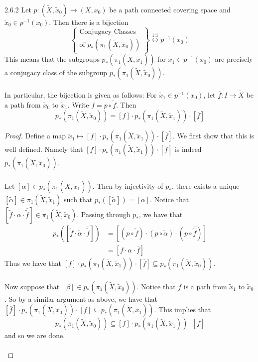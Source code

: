 \documentclass[a4paper]{article}
\begin{document}
\begin{prp}{}{2.6.2} Let $p:(\tilde{X},\tilde{x}_0)\to (X,x_0)$ be a path connected covering space and $\tilde{x}_0\in p^{-1}(x_0)$. Then there is a bijection $$\left\{\substack{\text{Conjugacy Classes}\\\text{of }p_\ast(\pi_1(\tilde{X},\tilde{x}_0))}\right\}\overset{\text{1:1}}{\longleftrightarrow} p^{-1}(x_0)$$ This means that the subgroups $p_\ast(\pi_1(\tilde{X},\tilde{x}_1))$ for $\tilde{x}_1\in p^{-1}(x_0)$ are precisely a conjugacy class of the subgroup $p_\ast(\pi_1(\tilde{X},\tilde{x}_0))$. \\~\\

In particular, the bijection is given as follows: For $\tilde{x}_1\in p^{-1}(x_0)$, let $\overline{f}:I\to\tilde{X}$ be a path from $\tilde{x}_0$ to $\tilde{x}_1$. Write $f=p\circ\tilde{f}$. Then $$p_\ast(\pi_1(\tilde{X},\tilde{x}_0))=[f]\cdot p_\ast(\pi_1(\tilde{X},\tilde{x}_1))\cdot[\overline{f}]$$ \tcbline
\begin{proof}
Define a map $\tilde{x}_1\mapsto[f]\cdot p_\ast(\pi_1(\tilde{X},\tilde{x}_1))\cdot[\overline{f}]$. We first show that this is well defined. Namely that $[f]\cdot p_\ast(\pi_1(\tilde{X},\tilde{x}_1))\cdot[\overline{f}]$ is indeed $p_\ast(\pi_1(\tilde{X},\tilde{x}_0))$. \\~\\

Let $[\alpha]\in p_\ast(\pi_1(\tilde{X},\tilde{x}_1))$. Then by injectivity of $p_\ast$, there exists a unique $[\tilde{\alpha}]\in\pi_1(\tilde{X},\tilde{x}_1)$ such that $p_\ast([\tilde{\alpha}])=[\alpha]$. Notice that $[\tilde{f}\cdot\alpha\cdot\overline{\tilde{f}}]\in\pi_1(\tilde{X},\tilde{x}_0)$. Passing through $p_\ast$, we have that 
\begin{align*}
p_\ast\left([\tilde{f}\cdot\tilde{\alpha}\cdot\overline{\tilde{f}}]\right)&=[(p\circ\tilde{f})\cdot(p\circ\tilde{\alpha})\cdot(p\circ\overline{\tilde{f}})]\\
&=[f\cdot\alpha\cdot\overline{f}]
\end{align*}
Thus we have that $[f]\cdot p_\ast(\pi_1(\tilde{X},\tilde{x}_1))\cdot[\overline{f}]\subseteq p_\ast(\pi_1(\tilde{X},\tilde{x}_0))$. \\~\\

Now suppose that $[\beta]\in p_\ast(\pi_1(\tilde{X},\tilde{x}_0))$. Notice that $\overline{f}$ is a path from $\tilde{x}_1$ to $\tilde{x}_0$. So by a similar argument as above, we have that $[\overline{f}]\cdot p_\ast(\pi_1(\tilde{X},\tilde{x}_0))\cdot[f]\subseteq p_\ast(\pi_1(\tilde{X},\tilde{x}_1))$. This implies that $$p_\ast(\pi_1(\tilde{X},\tilde{x}_0))\subseteq [f]\cdot p_\ast(\pi_1(\tilde{X},\tilde{x}_1))\cdot[\overline{f}]$$ and so we are done. \\~\\


\end{proof}
\end{prp}
\end{document}
